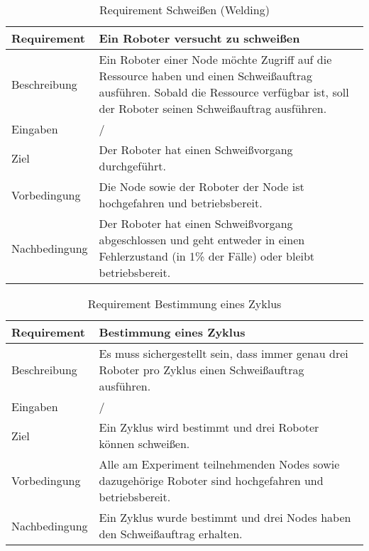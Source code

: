 \begin{table}[h!]
\begin{center}
\begin{tabular}{ |p{2.5cm}|p{11cm}| } 
 \hline
 Requirement & Ein Roboter versucht zu schweißen \\
 \hline
 Beschreibung & Ein Roboter einer Node möchte Zugriff auf die Ressource haben und einen Schweißauftrag
 ausführen. Sobald die Ressource verfügbar ist, soll der Roboter seinen Schweißauftrag ausführen.\\
 \hline
 Eingaben & / \\
 \hline
 Ziel & Der Roboter hat einen Schweißvorgang durchgeführt. \\
 \hline
 Vorbedingung & Die Node sowie der Roboter der Node ist hochgefahren und betriebsbereit. \\
 \hline
 Nachbedingung & Der Roboter hat einen Schweißvorgang abgeschlossen und geht entweder in einen Fehlerzustand
 (in 1\% der Fälle) oder bleibt betriebsbereit. \\
 \hline
\end{tabular}
\caption{Requirement Schweißen (Welding)}
\label{table:reqwelding}
\end{center}
\end{table}

\begin{table}[h!]
\begin{center}
\begin{tabular}{ |p{2.5cm}|p{11cm}| } 
 \hline
 Requirement & Bestimmung eines Zyklus \\
 \hline
 Beschreibung & Es muss sichergestellt sein, dass immer genau drei Roboter pro Zyklus einen
 Schweißauftrag ausführen. \\
 \hline
 Eingaben & / \\
 \hline
 Ziel & Ein Zyklus wird bestimmt und drei Roboter können schweißen. \\
 \hline
 Vorbedingung & Alle am Experiment teilnehmenden Nodes sowie dazugehörige Roboter sind
 hochgefahren und betriebsbereit. \\
 \hline
 Nachbedingung & Ein Zyklus wurde bestimmt und drei Nodes haben den Schweißauftrag erhalten. \\
 \hline
\end{tabular}
\caption{Requirement Bestimmung eines Zyklus}
\label{table:reqchoosecycle}
\end{center}
\end{table}

